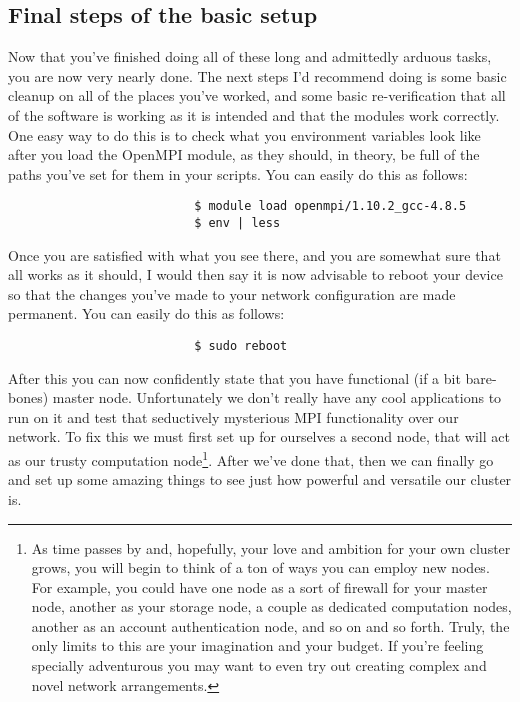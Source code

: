 \documentclass[]{article}
\begin{document}
                          \subsection{Final steps of the basic setup}
                          Now that you've finished doing all of these long and admittedly arduous tasks, you are now very nearly done. The next steps I'd 
                          recommend doing is some basic cleanup on all of the places you've worked, and some basic re-verification that all of the software is
                          working as it is intended and that the modules work correctly. One easy way to do this is to check what you environment variables look
                          like after you load the OpenMPI module, as they should, in theory, be full of the paths you've set for them in your scripts. You can
                          easily do this as follows:
                          \begin{lstlisting}
                          $ module load openmpi/1.10.2_gcc-4.8.5
                          $ env | less
                          \end{lstlisting}
                          Once you are satisfied with what you see there, and you are somewhat sure that all works as it should, I would then say it is now 
                          advisable to reboot your device so that the changes you've made to your network configuration are made permanent. You can easily do
                          this as follows:
                          \begin{lstlisting}
                          $ sudo reboot
                          \end{lstlisting}
                          After this you can now confidently state that you have functional (if a bit bare-bones) master node. Unfortunately we don't really have
                          any cool applications to run on it and test that seductively mysterious MPI functionality over our network. To fix this we must first
                          set up for ourselves a second node, that will act as our trusty computation node\footnote{As time passes by and, hopefully, your love 
                              and ambition for your own cluster grows, you will begin to think of a ton of ways you can employ new nodes. For example, you could have 
                                  one node as a sort of firewall for your master node, another as your storage node, a couple as dedicated computation nodes, another as 
                                  an account authentication node, and so on and so forth. Truly, the only limits to this are your imagination and your budget. If you're
                                  feeling specially adventurous you may want to even try out creating complex and novel network arrangements.}. After we've done that, 
                                  then we can finally go and set up some amazing things to see just how powerful and versatile our cluster is.
\end{document}
